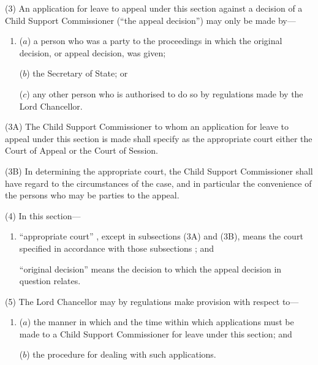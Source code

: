 \documentclass[12pt,a4paper]{article}
\begin{document}
(3) An application for leave to appeal under this section against a decision of a Child Support Commissioner (“the appeal decision”) may only be made by—
\begin{enumerate}\item[]
($a$) a person who was a party to the proceedings in which the original decision, or appeal decision, was given;

($b$) the Secretary of State; or

($c$) any other person who is authorised to do so by regulations made by the Lord Chancellor.
\end{enumerate}

(3A) The Child Support Commissioner to whom an application for leave to appeal under this section is made shall specify as the appropriate court either the Court of Appeal or the Court of Session.

(3B) In determining the appropriate court, the Child Support Commissioner shall have regard to the circumstances of the case, and in particular the convenience of the persons who may be parties to the appeal.

(4) In this section—
\begin{enumerate}\item[]
    “appropriate court”%
, except in subsections (3A) and (3B), means the court specified in accordance with those subsections%
; and

    “original decision” means the decision to which the appeal decision in question relates. 
\end{enumerate}

(5) The Lord Chancellor may by regulations make provision with respect to—
\begin{enumerate}\item[]
($a$) the manner in which and the time within which applications must be made to a Child Support Commissioner for leave under this section; and

($b$) the procedure for dealing with such applications.
\end{enumerate}
\end{document}
